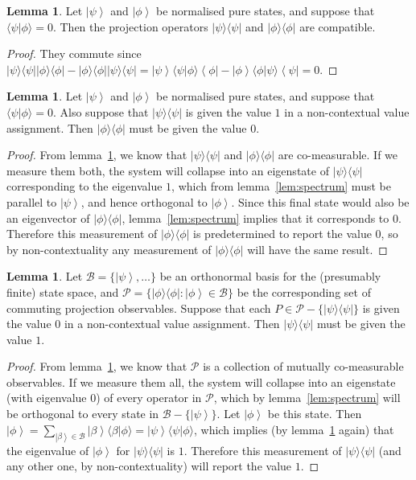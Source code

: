 \documentclass[11pt, a4paper]{article}
\theoremstyle{definition}
\newtheorem{lemma}[Theorem]{Lemma}
\newcommand{\bra}[1]{\left< #1 \right|}
\newcommand{\ket}[1]{\left| #1 \right>}
\newcommand{\iprod}[2]{\langle #1 | #2 \rangle}
\newcommand{\oprod}[2]{| #1 \rangle\langle #2 |}
\begin{document}
\begin{lemma}
\label{lem:compatible}
Let $\ket{\psi}$ and $\ket{\phi}$ be normalised pure states, and suppose that $\iprod{\psi}{\phi} = 0$.
Then the projection operators $\oprod{\psi}{\psi}$ and $\oprod{\phi}{\phi}$ are compatible.
\end{lemma}
\begin{proof}
They commute since $\oprod{\psi}{\psi} \oprod{\phi}{\phi} - \oprod{\phi}{\phi} \oprod{\psi}{\psi} = \ket{\psi} \iprod{\psi}{\phi} \bra{\phi} - \ket{\phi} \iprod{\phi}{\psi} \bra{\psi} = 0$.
\end{proof}
\begin{lemma}
\label{lem:yes to no}
Let $\ket{\psi}$ and $\ket{\phi}$ be normalised pure states, and suppose that $\iprod{\psi}{\phi} = 0$.
Also suppose that $\oprod{\psi}{\psi}$ is given the value $1$ in a non-contextual value assignment.
Then $\oprod{\phi}{\phi}$ must be given the value $0$.
\end{lemma}
\begin{proof}
From lemma~\ref{lem:compatible}, we know that $\oprod{\psi}{\psi}$ and $\oprod{\phi}{\phi}$ are co-measurable.
If we measure them both, the system will collapse into an eigenstate of $\oprod{\psi}{\psi}$ corresponding to the eigenvalue $1$, which from lemma~\ref{lem:spectrum} must be parallel to $\ket{\psi}$, and hence orthogonal to $\ket{\phi}$.
Since this final state would also be an eigenvector of $\oprod{\phi}{\phi}$, lemma~\ref{lem:spectrum} implies that it corresponds to $0$.
Therefore this measurement of $\oprod{\phi}{\phi}$ is predetermined to report the value $0$, so by non-contextuality any measurement of $\oprod{\phi}{\phi}$ will have the same result.
\end{proof}
\begin{lemma}
\label{lem:no to yes}
Let $\mathcal{B} = \{ \ket{\psi}, \dots \}$ be an orthonormal basis for the (presumably finite) state space, and $\mathcal{P} = \{ \oprod{\phi}{\phi} : \ket{\phi} \in \mathcal{B} \}$ be the corresponding set of commuting projection observables.
Suppose that each $P \in \mathcal{P} - \{ \oprod{\psi}{\psi} \}$ is given the value $0$ in a non-contextual value assignment.
Then $\oprod{\psi}{\psi}$ must be given the value $1$.
\end{lemma}
\begin{proof}
From lemma~\ref{lem:compatible}, we know that $\mathcal{P}$ is a collection of mutually co-measurable observables.
If we measure them all, the system will collapse into an eigenstate (with eigenvalue $0$) of every operator in $\mathcal{P}$, which by lemma~\ref{lem:spectrum} will be orthogonal to every state in $\mathcal{B} - \{\ket{\psi}\}$.
Let $\ket{\phi}$ be this state.
Then $\ket{\phi} = \sum_{\ket{\beta} \in \mathcal{B}} \ket{\beta} \iprod{\beta}{\phi} = \ket{\psi} \iprod{\psi}{\phi}$, which implies (by lemma~\ref{lem:compatible} again) that the eigenvalue of $\ket{\phi}$ for $\oprod{\psi}{\psi}$ is $1$.
Therefore this measurement of $\oprod{\psi}{\psi}$ (and any other one, by non-contextuality) will report the value $1$.
\end{proof}
\end{document}
